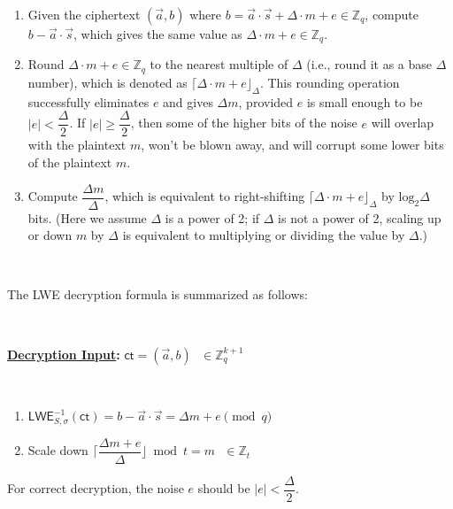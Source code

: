 \begin{enumerate}
\item Given the ciphertext $(\vec{a}, b)$ where $b = \vec{a} \cdot \vec{s} + \Delta \cdot m + e \in \mathbb{Z}_q$, compute $b - \vec{a} \cdot \vec{s}$, which gives the same value as $\Delta \cdot m + e \in \mathbb{Z}_q$. 
\item Round $\Delta \cdot m + e \in \mathbb{Z}_q$ to the nearest multiple of $\Delta$ (i.e., round it as a base $\Delta$ number), which is denoted as $\lceil \Delta \cdot m + e \rfloor_{\Delta}$. This rounding operation successfully eliminates $e$ and gives $\Delta m$, provided $e$ is small enough to be $|e| < \dfrac{\Delta}{2}$. If $|e| \geq \dfrac{\Delta}{2}$, then some of the higher bits of the noise $e$ will overlap with the plaintext $m$, won't be blown away, and will corrupt some lower bits of the plaintext $m$.
\item Compute $\dfrac{\Delta m} {\Delta}$, which is equivalent to right-shifting $\lceil \Delta \cdot m + e \rfloor_{\Delta}$ by $\text{log}_2 \Delta$ bits. (Here we assume $\Delta$ is a power of 2; if $\Delta$ is not a power of 2, scaling up or down $m$ by $\Delta$ is equivalent to multiplying or dividing the value by $\Delta$.) 
\end{enumerate}

$ $

The LWE decryption formula is summarized as follows:

$ $

\begin{tcolorbox}[title={\textbf{\tboxlabel{\ref*{subsec:lwe-dec}} LWE Decryption}}]

\textbf{\underline{Decryption Input}:} $\textsf{ct} = (\vec{a}, b) \text{ } \in \mathbb{Z}_q^{k+1}$

$ $

\begin{enumerate}
\item $\textsf{LWE}^{-1}_{S,\sigma}(\textsf{ct}) = b - \vec{a}\cdot \vec{s} = \Delta  m + e \pmod q$

\item Scale down $\Bigg\lceil\dfrac{ \Delta  m + e } {\Delta}\Bigg\rfloor \bmod t = m \text{ } \in \mathbb{Z}_t$
\end{enumerate}

For correct decryption, the noise $e$ should be $|e| < \dfrac{\Delta}{2}$.

\end{tcolorbox}

